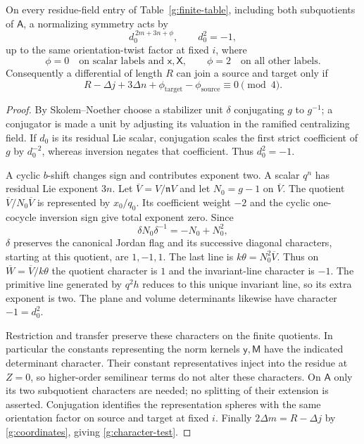 \begin{lemma}\label{g:character}
On every residue-field entry of Table~\ref{g:finite-table},
including both subquotients of $\mathsf A$, a normalizing
symmetry acts by
\begin{equation}\label{g:character-formula}
 d_0^{\,2m+3n+\phi},\qquad d_0^2=-1,
\end{equation}
up to the same orientation-twist factor at fixed $i$, where
\[
 \phi=0\quad\text{on scalar labels and }\mathsf x,\mathsf X,
 \qquad
 \phi=2\quad\text{on all other labels}.
\]
Consequently a differential of length $R$ can join a source
and target only if
\begin{equation}\label{g:character-test}
 R-\Delta j+3\Delta n+\phi_{\mathrm{target}}
 -\phi_{\mathrm{source}}\equiv0\pmod4.
\end{equation}
\end{lemma}

\begin{proof}
By Skolem--Noether choose a stabilizer unit $\delta$
conjugating $g$ to $g^{-1}$; a conjugator is made a unit
by adjusting its valuation in the ramified centralizing
field.  If $d_0$ is its residual Lie scalar, conjugation
scales the first strict coefficient of $g$ by $d_0^{-2}$,
whereas inversion negates that coefficient.  Thus
$d_0^2=-1$.

A cyclic $b$-shift changes sign and contributes exponent
two.  A scalar $q^n$ has residual Lie exponent $3n$.
Let $\overline V=V/\mathfrak nV$ and let $N_0=g-1$ on
$\overline V$.  The quotient $\overline V/N_0\overline V$
is represented by $x_0/q_0$.  Its coefficient weight $-2$
and the cyclic one-cocycle inversion sign give total
exponent zero.  Since
\[
 \delta N_0\delta^{-1}=-N_0+N_0^2,
\]
$\delta$ preserves the canonical Jordan flag and its
successive diagonal characters, starting at this quotient,
are $1,-1,1$.  The last line is
$k\theta=N_0^2\overline V$.  Thus on
$\overline W=\overline V/k\theta$ the quotient character
is $1$ and the invariant-line character is $-1$.
The primitive line generated by $q^2h$ reduces to this
unique invariant line, so its extra exponent is two.
The plane and volume determinants likewise have
character $-1=d_0^2$.

Restriction and transfer preserve these characters on
the finite quotients.  In particular the constants
representing the norm kernels $\mathsf y,\mathsf M$
have the indicated determinant character.  Their constant
representatives inject into the residue at $Z=0$, so
higher-order semilinear terms do not alter these characters.  On
$\mathsf A$ only its two subquotient characters are
needed; no splitting of their extension is asserted.
Conjugation identifies the representation spheres
with the same orientation factor on source and target
at fixed $i$.  Finally $2\Delta m=R-\Delta j$ by
\eqref{g:coordinates}, giving
\eqref{g:character-test}.
\end{proof}

